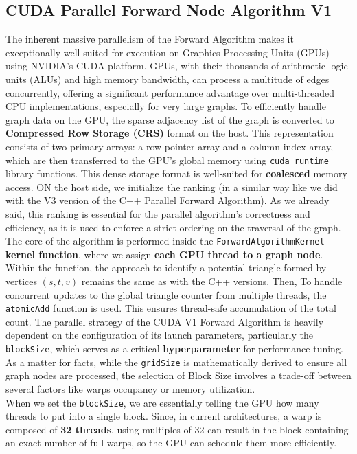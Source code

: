 \documentclass{aes2e}
\begin{document}
\subsection{CUDA Parallel Forward Node Algorithm V1}
The inherent massive parallelism of the Forward Algorithm makes it exceptionally well-suited for execution on Graphics Processing Units (GPUs) using NVIDIA's CUDA platform. GPUs, with their thousands of arithmetic logic units (ALUs) and high memory bandwidth, can process a multitude of edges concurrently, offering a significant performance advantage over multi-threaded CPU implementations, especially for very large graphs.
To efficiently handle graph data on the GPU, the sparse adjacency list of the graph is converted to \textbf{Compressed Row Storage (CRS)} format on the host. This representation consists of two primary arrays: a row pointer array and a column index array, which are then transferred to the GPU's global memory using \texttt{cuda\_runtime} library functions. This dense storage format is well-suited for \textbf{coalesced} memory access. ON the host side, we initialize the ranking (in a similar way like we did with the V3 version of the C++ Parallel Forward Algorithm). As we already said, this ranking is essential for the parallel algorithm's correctness and efficiency, as it is used to enforce a strict ordering on the traversal of the graph. The core of the algorithm is performed inside the \texttt{ForwardAlgorithmKernel} \textbf{kernel function}, where we assign \textbf{each GPU thread to a graph node}. Within the function, the approach to identify a potential triangle formed by vertices $(s, t, v)$ remains the same as with the C++ versions. Then, To handle concurrent updates to the global triangle counter from multiple threads, the \texttt{atomicAdd} function is used. This ensures thread-safe accumulation of the total count.
The parallel strategy of the CUDA V1 Forward Algorithm is heavily dependent on the configuration of its launch parameters, particularly the \texttt{blockSize}, which serves as a critical \textbf{hyperparameter} for performance tuning. As a matter for facts, while the \texttt{gridSize} is mathematically derived to ensure all graph nodes are processed, the selection of Block Size involves a trade-off between several factors like warps occupancy or memory utilization. \\
When we set the \texttt{blockSize}, we are essentially telling the GPU how many threads to put into a single block. Since, in current architectures, a warp is composed of \textbf{32 threads}, using multiples of 32 can result in the block containing an exact number of full warps, so the GPU can schedule them more efficiently.
\end{document}
